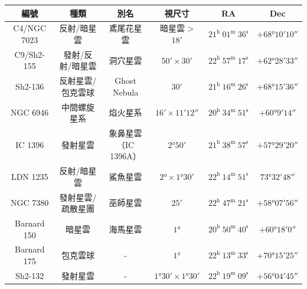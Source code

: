 \begin{center}
\begin{longtable}{c | c | c | c | c | c}
    編號 & 種類 & 別名 & 視尺寸 & RA & Dec \\
    \hline
    \endfirsthead


    \endfoot

    \endlastfoot

    C4/NGC 7023 & 反射/暗星雲 & 鳶尾花星雲 & 暗星雲 > \(\ang{;18;}\) & \(21^\text{h }01^\text{m }36^\text{s}\) & \(+\ang{68;10;10}\) \\ %
    C9/Sh2-155 & 發射/反射/暗星雲 & 洞穴星雲 & \(\ang{;50;}\times\ang{;30;}\) & \(22^\text{h }57^\text{m }17^\text{s}\) & \(+\ang{62;28;33}\) \\ %
    Sh2-136 & 反射星雲/包克雲球 & Ghost Nebula & \(\ang{;30;}\) & \(21^\text{h }16^\text{m }26^\text{s}\) & \(+\ang{68;15;36}\) \\ %
    NGC 6946 & 中間螺旋星系 & 焰火星系 & \(\ang{;16;}\times\ang{;11;12}\) & \(20^\text{h }34^\text{m }51^\text{s}\) & \(+\ang{60;9;14}\) \\ %
    IC 1396 & 發射星雲 & \makecell{象鼻星雲\\（IC 1396A）} & \(\ang{2;50;}\) & \(21^\text{h }38^\text{m }57^\text{s}\) & \(+\ang{57;29;20}\) \\ %
    LDN 1235 & 反射/暗星雲 & 鯊魚星雲 & \(\ang{2;;}\times\ang{1;30;}\) & \(22^\text{h }14^\text{m }51^\text{s}\) & \(\ang{73;32;48}\) \\ %
    NGC 7380 & 發射星雲/疏散星團 & 巫師星雲 & \(\ang{;25;}\) & \(22^\text{h }47^\text{m }21^\text{s}\) & \(+\ang{58;07;56}\) \\ %
    Barnard 150 & 暗星雲 & 海馬星雲 & \(\ang{1;;}\) & \(20^\text{h }50^\text{m }40^\text{s}\) & \(+\ang{60;18;0}\) \\
    Barnard 175 & 包克雲球 & - & \(\ang{1;;}\) & \(22^\text{h }13^\text{m }33^\text{s}\) & \(+\ang{70;15;25}\) \\
    Sh2-132 & 發射星雲 & - & \(\ang{1;30}\times\ang{1;30;}\) & \(22^\text{h }19^\text{m }09^\text{s}\) & \(+\ang{56;04;45}\)
\end{longtable}
\end{center}


